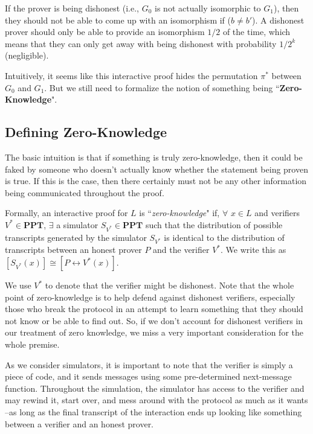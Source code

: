 \documentclass[11pt]{article}
\newcommand{\PPT}{\mathbf{PPT}}
\begin{document}
If the prover is being dishonest (i.e., \(G_0\) is not actually isomorphic to \(G_1\)), then they should not be able to come up with an isomorphism if (\(b\ne b'\)). A dishonest prover should only be able to provide an isomorphism \(1/2\) of the time, which means that they can only get away with being dishonest with probability \(1/2^k\) (negligible).\bigskip

Intuitively, it seems like this interactive proof hides the permutation \(\pi^*\) between \(G_0\) and \(G_1\). But we still need to formalize the notion of something being ``\textbf{Zero-Knowledge}".

\subsection{Defining Zero-Knowledge}
The basic intuition is that if something is truly zero-knowledge, then it could be faked by someone who doesn't actually know whether the statement being proven is true. If this is the case, then there certainly must not be any other information being communicated throughout the proof.\bigskip

Formally, an interactive proof for \(L\) is ``\emph{zero-knowledge}" if, \(\forall\) \(x\in L\) and verifiers \(V^*\in\PPT\), \(\exists\) a simulator \(S_{V^*}\in\PPT\) such that the distribution of possible transcripts generated by the simulator \(S_{V^*}\) is identical to the distribution of transcripts between an honest prover \(P\) and the verifier \(V^*\). We write this as \([S_{V^*}(x)] \cong [P\leftrightarrow V^*(x)]\).\smallskip

We use \(V^*\) to denote that the verifier might be dishonest. Note that the whole point of zero-knowledge is to help defend against dishonest verifiers, especially those who break the protocol in an attempt to learn something that they should not know or be able to find out. So, if we don't account for dishonest verifiers in our treatment of zero knowledge, we miss a very important consideration for the whole premise.\medskip

As we consider simulators, it is important to note that the verifier is simply a piece of code, and it sends messages using some pre-determined next-message function. Throughout the simulation, the simulator has access to the verifier and may rewind it, start over, and mess around with the protocol as much as it wants --as long as the final transcript of the interaction ends up looking like something between a verifier and an honest prover.
\end{document}
